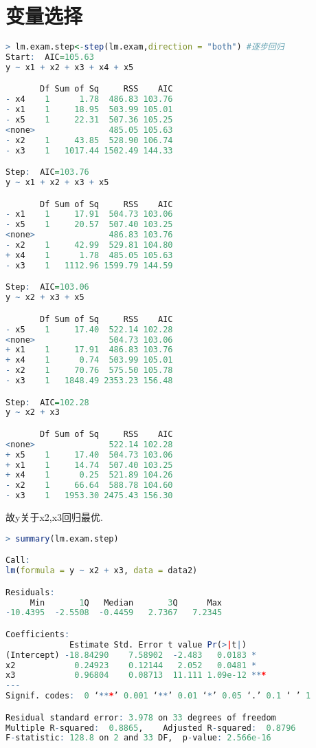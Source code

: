 \documentclass[11pt,a4paper,oneside]{book}
\begin{document}
\section{变量选择}
\begin{lstlisting}[language=r]
> lm.exam.step<-step(lm.exam,direction = "both") #逐步回归
Start:  AIC=105.63
y ~ x1 + x2 + x3 + x4 + x5

       Df Sum of Sq     RSS    AIC
- x4    1      1.78  486.83 103.76
- x1    1     18.95  503.99 105.01
- x5    1     22.31  507.36 105.25
<none>               485.05 105.63
- x2    1     43.85  528.90 106.74
- x3    1   1017.44 1502.49 144.33

Step:  AIC=103.76
y ~ x1 + x2 + x3 + x5

       Df Sum of Sq     RSS    AIC
- x1    1     17.91  504.73 103.06
- x5    1     20.57  507.40 103.25
<none>               486.83 103.76
- x2    1     42.99  529.81 104.80
+ x4    1      1.78  485.05 105.63
- x3    1   1112.96 1599.79 144.59

Step:  AIC=103.06
y ~ x2 + x3 + x5

       Df Sum of Sq     RSS    AIC
- x5    1     17.40  522.14 102.28
<none>               504.73 103.06
+ x1    1     17.91  486.83 103.76
+ x4    1      0.74  503.99 105.01
- x2    1     70.76  575.50 105.78
- x3    1   1848.49 2353.23 156.48

Step:  AIC=102.28
y ~ x2 + x3

       Df Sum of Sq     RSS    AIC
<none>               522.14 102.28
+ x5    1     17.40  504.73 103.06
+ x1    1     14.74  507.40 103.25
+ x4    1      0.25  521.89 104.26
- x2    1     66.64  588.78 104.60
- x3    1   1953.30 2475.43 156.30
\end{lstlisting}
故y关于x2,x3回归最优.
\begin{lstlisting}[language=r]
> summary(lm.exam.step)

Call:
lm(formula = y ~ x2 + x3, data = data2)

Residuals:
     Min       1Q   Median       3Q      Max 
-10.4395  -2.5508  -0.4459   2.7367   7.2345 

Coefficients:
             Estimate Std. Error t value Pr(>|t|)    
(Intercept) -18.84290    7.58902  -2.483   0.0183 *  
x2            0.24923    0.12144   2.052   0.0481 *  
x3            0.96804    0.08713  11.111 1.09e-12 ***
---
Signif. codes:  0 ‘***’ 0.001 ‘**’ 0.01 ‘*’ 0.05 ‘.’ 0.1 ‘ ’ 1

Residual standard error: 3.978 on 33 degrees of freedom
Multiple R-squared:  0.8865,	Adjusted R-squared:  0.8796 
F-statistic: 128.8 on 2 and 33 DF,  p-value: 2.566e-16
\end{lstlisting}
\end{document}
